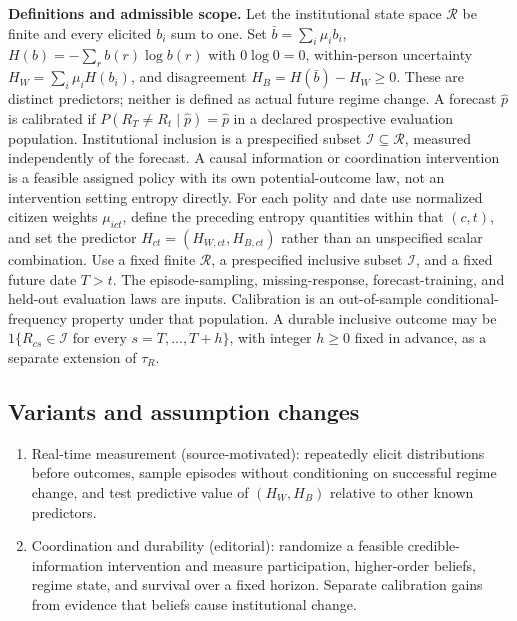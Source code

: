 \documentclass[11pt,a4paper]{article}
\begin{document}
\textbf{Definitions and admissible scope.} Let the institutional state space \(\mathcal R\) be finite and every elicited \(b_i\) sum to one. Set \(\bar b=\sum_i\mu_i b_i\), \(H(b)=-\sum_r b(r)\log b(r)\) with \(0\log0=0\), within-person uncertainty \(H_W=\sum_i\mu_iH(b_i)\), and disagreement \(H_B=H(\bar b)-H_W\ge0\). These are distinct predictors; neither is defined as actual future regime change. A forecast \(\widehat p\) is calibrated if \(P(R_T\ne R_t\mid\widehat p)=\widehat p\) in a declared prospective evaluation population. Institutional inclusion is a prespecified subset \(\mathcal I\subseteq\mathcal R\), measured independently of the forecast. A causal information or coordination intervention is a feasible assigned policy with its own potential-outcome law, not an intervention setting entropy directly. For each polity and date use normalized citizen weights \(\mu_{ict}\), define the preceding entropy quantities within that \((c,t)\), and set the predictor \(H_{ct}=(H_{W,ct},H_{B,ct})\) rather than an unspecified scalar combination. Use a fixed finite \(\mathcal R\), a prespecified inclusive subset \(\mathcal I\), and a fixed future date \(T>t\). The episode-sampling, missing-response, forecast-training, and held-out evaluation laws are inputs. Calibration is an out-of-sample conditional-frequency property under that population. A durable inclusive outcome may be \(1\{R_{cs}\in\mathcal I\text{ for every }s=T,\ldots,T+h\}\), with integer \(h\ge0\) fixed in advance, as a separate extension of \(\tau_R\).
\subsection*{Variants and assumption changes}
\begin{enumerate}
\item Real-time measurement (source-motivated): repeatedly elicit distributions before outcomes, sample episodes without conditioning on successful regime change, and test predictive value of \((H_W,H_B)\) relative to other known predictors.
\item Coordination and durability (editorial): randomize a feasible credible-information intervention and measure participation, higher-order beliefs, regime state, and survival over a fixed horizon. Separate calibration gains from evidence that beliefs cause institutional change.
\end{enumerate}
\end{document}

